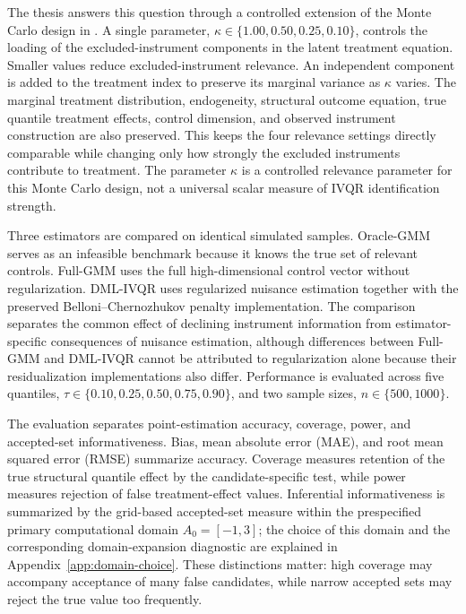 The thesis answers this question through a controlled extension of the Monte Carlo design in \textcite{chen_huang_tien_2021}. A single parameter, $\kappa \in \{1.00,0.50,0.25,0.10\}$, controls the loading of the excluded-instrument components in the latent treatment equation. Smaller values reduce excluded-instrument relevance. An independent component is added to the treatment index to preserve its marginal variance as $\kappa$ varies. The marginal treatment distribution, endogeneity, structural outcome equation, true quantile treatment effects, control dimension, and observed instrument construction are also preserved. This keeps the four relevance settings directly comparable while changing only how strongly the excluded instruments contribute to treatment. The parameter $\kappa$ is a controlled relevance parameter for this Monte Carlo design, not a universal scalar measure of IVQR identification strength.

Three estimators are compared on identical simulated samples. Oracle-GMM serves as an infeasible benchmark because it knows the true set of relevant controls. Full-GMM uses the full high-dimensional control vector without regularization. DML-IVQR uses regularized nuisance estimation together with the preserved Belloni--Chernozhukov penalty implementation. The comparison separates the common effect of declining instrument information from estimator-specific consequences of nuisance estimation, although differences between Full-GMM and DML-IVQR cannot be attributed to regularization alone because their residualization implementations also differ. Performance is evaluated across five quantiles, $\tau\in\{0.10,0.25,0.50,0.75,0.90\}$, and two sample sizes, $n\in\{500,1000\}$.

The evaluation separates point-estimation accuracy, coverage, power, and accepted-set informativeness. Bias, mean absolute error (MAE), and root mean squared error (RMSE) summarize accuracy. Coverage measures retention of the true structural quantile effect by the candidate-specific test, while power measures rejection of false treatment-effect values. Inferential informativeness is summarized by the grid-based accepted-set measure within the prespecified primary computational domain \(A_0=[-1,3]\); the choice of this domain and the corresponding domain-expansion diagnostic are explained in Appendix~\ref{app:domain-choice}. These distinctions matter: high coverage may accompany acceptance of many false candidates, while narrow accepted sets may reject the true value too frequently.

